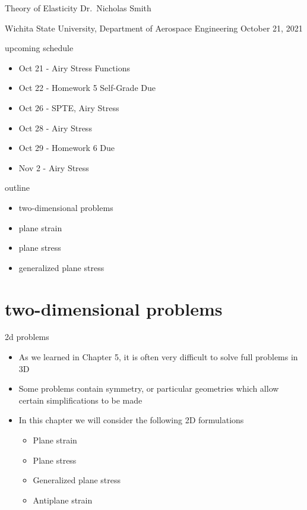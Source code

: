 \documentclass[
  letterpaper,
  ignorenonframetext,
  aspectratio=43,
  handout,
  12pt]{beamer}
\author{}
\date{}
\providecommand{\tightlist}{%
  \setlength{\itemsep}{0pt}\setlength{\parskip}{0pt}}
\providecommand{\tightlist}{%
\setlength{\itemsep}{0pt}\setlength{\parskip}{0pt}}
\begin{document}
\begin{frame}{Theory of Elasticity}
\protect\hypertarget{theory-of-elasticity}{}
Dr.~Nicholas Smith

Wichita State University, Department of Aerospace Engineering October
21, 2021
\end{frame}

\begin{frame}{upcoming schedule}
\protect\hypertarget{upcoming-schedule}{}
\begin{itemize}
\tightlist
\item
  Oct 21 - Airy Stress Functions
\item
  Oct 22 - Homework 5 Self-Grade Due
\item
  Oct 26 - SPTE, Airy Stress
\item
  Oct 28 - Airy Stress
\item
  Oct 29 - Homework 6 Due
\item
  Nov 2 - Airy Stress
\end{itemize}
\end{frame}

\begin{frame}{outline}
\protect\hypertarget{outline}{}
\begin{itemize}
\tightlist
\item
  two-dimensional problems
\item
  plane strain
\item
  plane stress
\item
  generalized plane stress
\end{itemize}
\end{frame}

\hypertarget{two-dimensional-problems}{%
\section{two-dimensional problems}\label{two-dimensional-problems}}

\begin{frame}{2d problems}
\protect\hypertarget{d-problems}{}
\begin{itemize}
\tightlist
\item
  As we learned in Chapter 5, it is often very difficult to solve full
  problems in 3D
\item
  Some problems contain symmetry, or particular geometries which allow
  certain simplifications to be made
\item
  In this chapter we will consider the following 2D formulations

  \begin{itemize}
  \tightlist
  \item
    Plane strain
  \item
    Plane stress
  \item
    Generalized plane stress
  \item
    Antiplane strain
  \end{itemize}
\end{itemize}
\end{frame}
\end{document}
